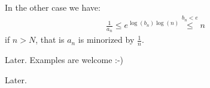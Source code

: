 \documentclass{article}
\begin{document}
\vspace{0.2cm}
\noindent In the other case we have:
\begin{gather*}
    \frac{1}{a_n} \le e^{\log(b_n) \log(n)} \stackrel{{b_n<e}}{\le} n
\end{gather*}
if $n>N$, that is $a_n$ is minorized by $\frac{1}{n}$.

\vspace{0.2cm}
\par\noindent Later. Examples are welcome :-)


\vspace{0.2cm}
\par\noindent Later.
\end{document}
